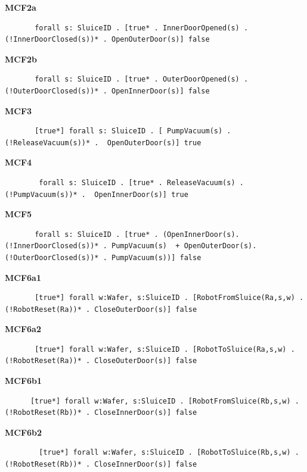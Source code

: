\documentclass[12pt]{report}
\begin{document}
    \textbf{MCF2a}
    \begin{lstlisting}
       forall s: SluiceID . [true* . InnerDoorOpened(s) . (!InnerDoorClosed(s))* . OpenOuterDoor(s)] false
       \end{lstlisting}

    \textbf{MCF2b}
    \begin{lstlisting}
       forall s: SluiceID . [true* . OuterDoorOpened(s) . (!OuterDoorClosed(s))* . OpenInnerDoor(s)] false
       \end{lstlisting}

    \textbf{MCF3}
    \begin{lstlisting}
       [true*] forall s: SluiceID . [ PumpVacuum(s) . (!ReleaseVacuum(s))* .  OpenOuterDoor(s)] true
       \end{lstlisting}

    \textbf{MCF4}
    \begin{lstlisting}
        forall s: SluiceID . [true* . ReleaseVacuum(s) . (!PumpVacuum(s))* .  OpenInnerDoor(s)] true
        \end{lstlisting}

    \textbf{MCF5}
    \begin{lstlisting}
       forall s: SluiceID . [true* . (OpenInnerDoor(s). (!InnerDoorClosed(s))* . PumpVacuum(s)  + OpenOuterDoor(s). (!OuterDoorClosed(s))* . PumpVacuum(s))] false
       \end{lstlisting}

    \textbf{MCF6a1}
    \begin{lstlisting}
       [true*] forall w:Wafer, s:SluiceID . [RobotFromSluice(Ra,s,w) . (!RobotReset(Ra))* . CloseOuterDoor(s)] false
       \end{lstlisting}

    \textbf{MCF6a2}
    \begin{lstlisting}
       [true*] forall w:Wafer, s:SluiceID . [RobotToSluice(Ra,s,w) . (!RobotReset(Ra))* . CloseOuterDoor(s)] false
    \end{lstlisting}
	
    \textbf{MCF6b1}
    \begin{lstlisting}
      [true*] forall w:Wafer, s:SluiceID . [RobotFromSluice(Rb,s,w) . (!RobotReset(Rb))* . CloseInnerDoor(s)] false
    \end{lstlisting}

    \textbf{MCF6b2}
    \begin{lstlisting}
        [true*] forall w:Wafer, s:SluiceID . [RobotToSluice(Rb,s,w) . (!RobotReset(Rb))* . CloseInnerDoor(s)] false
    \end{lstlisting}
\end{document}
